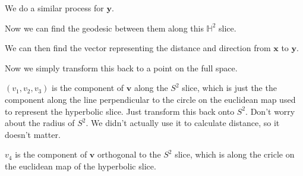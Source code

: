 \documentclass[12pt]{amsart}
\newcommand{\ignore}[1]{}
\begin{document}

We do a similar process for $\textbf{y}$.

Now we can find the geodesic between them along this $\mathbb{H}^2$ slice.

We can then find the vector representing the distance and direction from $\textbf{x}$ to $\textbf{y}$.

Now we simply transform this back to a point on the full space.

$(v_1,v_2,v_3)$ is the component of $\textbf{v}$ along the $S^2$ slice, which is just the the component along the line perpendicular to the circle on the euclidean map used to represent the hyperbolic slice. Just transform this back onto $S^2$. Don't worry about the radius of $S^2$. We didn't actually use it to calculate distance, so it doesn't matter.

$v_4$ is the component of $\textbf{v}$ orthogonal to the $S^2$ slice, which is along the cricle on the euclidean map of the hyperbolic slice.

\ignore{
There is one more problem. There are multiple images of $\textbf{y}$ from $\textbf{x}$. They are all just multiples of $e^{2\pi k}$, but the problem is connecting them to the correct other images in a triangle. In order to do that, I need to standardize which is being referred to.

When finding the great circle on $S^2$, we need to find where it intersects with some imaginary line. For example, $z_2 = 0, z_1 \geq 0$.

The equation for the great circle is $\textbf{x}\cos\theta + \textbf{y}'\sin\theta$. Thus, we have to find $x_2\cos\theta + y'_2\sin\theta = 0$

$\frac{x_3}{y'_3} = \tan\theta$

$\theta = \arctan\frac{x_3}{y'_3}$

Only every other value for that is correct. We just have to test to see if the first attempt fulfills $x_1\cos\theta + y_1\sin\theta \geq 0$, and add $\pi$ if it does not.

Now we add or subtract $2\pi$ to make sure it's in the correct range.

We make sure to store an extra integer $n$ in $\textbf{y}$, representing how many extra loops around the circle it goes. Once we move it into the $\mathbb{H}^2$ slice, we just multiply it by $e^{nk}$ to make sure it's in the right place.

The purpose of this is that I need a covering map that shows how many loops around it went. In this case, I used the universal covering space of $S^2$ minus the poles. I essentially did it on a nonstandard topology of $S^2 \times \mathbb{Z}$.
}
\end{document}
